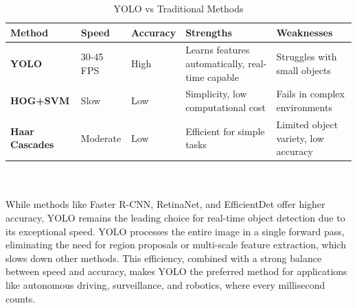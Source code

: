 %
\begin{table}[ht]
\centering
\caption{YOLO vs Traditional Methods}
\vspace{0.3cm} 
\begin{tabular}{|l|l|l|p{4.5cm}|p{4.5cm}|}
\hline
\textbf{Method}       & \textbf{Speed} & \textbf{Accuracy} & \textbf{Strengths}                                 & \textbf{Weaknesses}                               \\ \hline
\textbf{YOLO}         & 30-45 FPS      & High             & Learns features automatically, real-time capable  & Struggles with small objects                     \\ \hline
\textbf{HOG+SVM}      & Slow           & Low              & Simplicity, low computational cost                & Fails in complex environments                    \\ \hline
\textbf{Haar Cascades} & Moderate       & Low              & Efficient for simple tasks                        & Limited object variety, low accuracy             \\ \hline
\end{tabular}
\label{tab:yolo_vs_traditional}
\end{table}
\\\\
%
While methods like Faster R-CNN, RetinaNet, and EfficientDet offer higher accuracy, YOLO remains the leading choice for real-time object detection due to its exceptional speed. YOLO processes the entire image in a single forward pass, eliminating the need for region proposals or multi-scale feature extraction, which slows down other methods. This efficiency, combined with a strong balance between speed and accuracy, makes YOLO the preferred method for applications like autonomous driving, surveillance, and robotics, where every millisecond counts.\\
%
